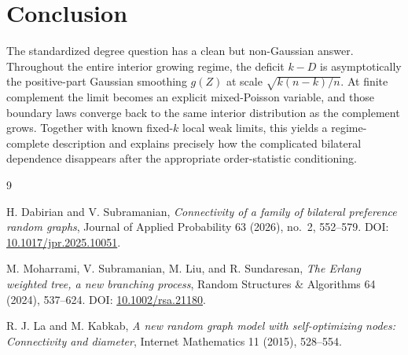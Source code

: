 \documentclass[11pt]{article}
\theoremstyle{remark}
\newcommand{\1}{\mathbf 1}
\begin{document}
\section{Conclusion}

The standardized degree question has a clean but non-Gaussian answer. Throughout the entire interior growing regime, the deficit $k-D$ is asymptotically the positive-part Gaussian smoothing $g(Z)$ at scale $\sqrt{k(n-k)/n}$. At finite complement the limit becomes an explicit mixed-Poisson variable, and those boundary laws converge back to the same interior distribution as the complement grows. Together with known fixed-$k$ local weak limits, this yields a regime-complete description and explains precisely how the complicated bilateral dependence disappears after the appropriate order-statistic conditioning.

\begin{thebibliography}{9}

H. Dabirian and V. Subramanian,
\emph{Connectivity of a family of bilateral preference random graphs},
Journal of Applied Probability 63 (2026), no.~2, 552--579.
DOI: \href{https://doi.org/10.1017/jpr.2025.10051}{10.1017/jpr.2025.10051}.

M. Moharrami, V. Subramanian, M. Liu, and R. Sundaresan,
\emph{The Erlang weighted tree, a new branching process},
Random Structures \& Algorithms 64 (2024), 537--624.
DOI: \href{https://doi.org/10.1002/rsa.21180}{10.1002/rsa.21180}.

R. J. La and M. Kabkab,
\emph{A new random graph model with self-optimizing nodes: Connectivity and diameter},
Internet Mathematics 11 (2015), 528--554.

\end{thebibliography}
\end{document}
